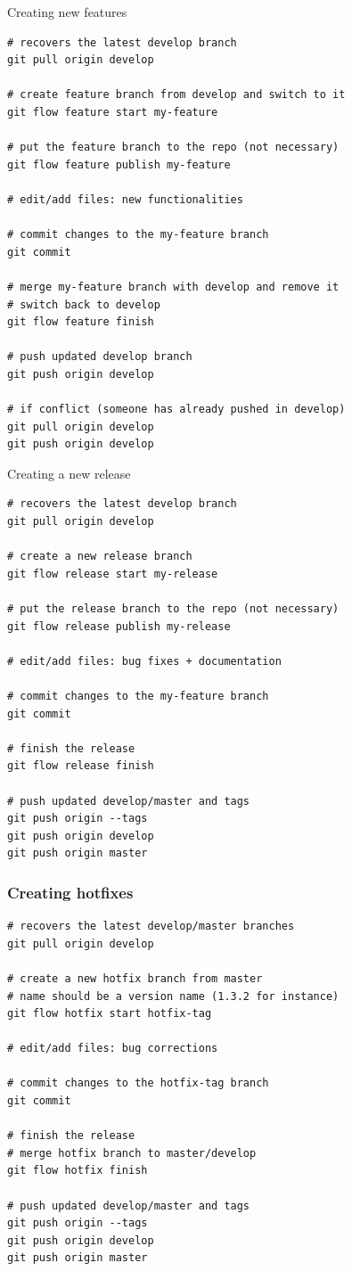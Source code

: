 \documentclass{beamer}
\begin{document}
\begin{frame}[fragile]{Creating new features}

\begin{lstlisting}
# recovers the latest develop branch
git pull origin develop

# create feature branch from develop and switch to it
git flow feature start my-feature 

# put the feature branch to the repo (not necessary)
git flow feature publish my-feature 

# edit/add files: new functionalities

# commit changes to the my-feature branch
git commit 

# merge my-feature branch with develop and remove it
# switch back to develop
git flow feature finish

# push updated develop branch
git push origin develop

# if conflict (someone has already pushed in develop)
git pull origin develop
git push origin develop
\end{lstlisting}

\end{frame}

\begin{frame}[fragile]{Creating a new release}

\begin{lstlisting}
# recovers the latest develop branch
git pull origin develop

# create a new release branch
git flow release start my-release

# put the release branch to the repo (not necessary)
git flow release publish my-release 

# edit/add files: bug fixes + documentation

# commit changes to the my-feature branch
git commit 

# finish the release
git flow release finish

# push updated develop/master and tags
git push origin --tags
git push origin develop
git push origin master
\end{lstlisting}
\end{frame}

\begin{frame}[fragile]
\frametitle{Creating hotfixes}
\begin{lstlisting}
# recovers the latest develop/master branches
git pull origin develop

# create a new hotfix branch from master
# name should be a version name (1.3.2 for instance)
git flow hotfix start hotfix-tag

# edit/add files: bug corrections

# commit changes to the hotfix-tag branch
git commit 

# finish the release
# merge hotfix branch to master/develop
git flow hotfix finish

# push updated develop/master and tags
git push origin --tags
git push origin develop
git push origin master
\end{lstlisting}
\end{frame}
\end{document}

